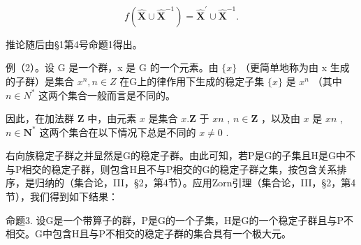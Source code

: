 \[
f (\hat {\mathbf {X}} \cup \hat {\mathbf {X}} ^ {- 1}) = \hat {\mathbf {X}} ^ {\prime} \cup \hat {\mathbf {X}} ^ {- 1}.
\]

推论随后由§1第4号命题1得出。

例（2）。设 G 是一个群，x 是 G 的一个元素。由 \(\{x\}\) （更简单地称为由 x 生成的子群）是集合 \(x^{n}, n \in Z\) 在G上的律作用下生成的稳定子集 \(\{x\}\) 是 \(x^{n}\) （其中 \(n \in N^{*}\) 这两个集合一般而言是不同的。

因此，在加法群 \(\mathbf{Z}\) 中，由元素 \(x\) 是集合 \(x.\mathbf{Z}\) 于 \(xn\) , \(n \in \mathbf{Z}\) ，以及由 \(x\) 是 \(xn\) , \(n \in \mathbf{N}^*\) 这两个集合在以下情况下总是不同的 \(x \neq 0\) .

右向族稳定子群之并显然是G的稳定子群。由此可知，若P是G的子集且H是G中不与P相交的稳定子群，则包含H且不与P相交的G的稳定子群之集，按包含关系排序，是归纳的（集合论，III，§2，第4节）。应用Zorn引理（集合论，III，§2，第4节），我们得到如下结果：

命题3. 设G是一个带算子的群，P是G的一个子集，H是G的一个稳定子群且与P不相交。G中包含H且与P不相交的稳定子群的集合具有一个极大元。

